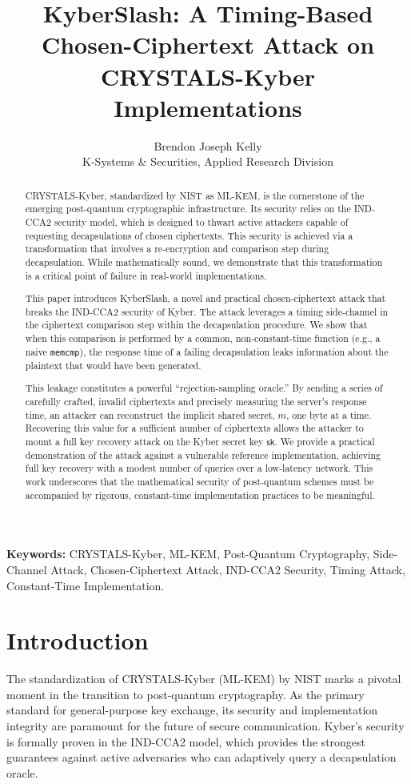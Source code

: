 \documentclass[11pt]{article}
\title{KyberSlash: A Timing-Based Chosen-Ciphertext Attack on CRYSTALS-Kyber Implementations}
\author{Brendon Joseph Kelly \\ K-Systems \& Securities, Applied Research Division}
\date{}
\begin{document}
\maketitle

\begin{abstract}
CRYSTALS-Kyber, standardized by NIST as ML-KEM, is the cornerstone of the emerging post-quantum cryptographic infrastructure. Its security relies on the IND-CCA2 security model, which is designed to thwart active attackers capable of requesting decapsulations of chosen ciphertexts. This security is achieved via a transformation that involves a re-encryption and comparison step during decapsulation. While mathematically sound, we demonstrate that this transformation is a critical point of failure in real-world implementations.

This paper introduces KyberSlash, a novel and practical chosen-ciphertext attack that breaks the IND-CCA2 security of Kyber. The attack leverages a timing side-channel in the ciphertext comparison step within the decapsulation procedure. We show that when this comparison is performed by a common, non-constant-time function (e.g., a naive \texttt{memcmp}), the response time of a failing decapsulation leaks information about the plaintext that would have been generated.

This leakage constitutes a powerful ``rejection-sampling oracle.'' By sending a series of carefully crafted, invalid ciphertexts and precisely measuring the server's response time, an attacker can reconstruct the implicit shared secret, $m$, one byte at a time. Recovering this value for a sufficient number of ciphertexts allows the attacker to mount a full key recovery attack on the Kyber secret key $\mathsf{sk}$. We provide a practical demonstration of the attack against a vulnerable reference implementation, achieving full key recovery with a modest number of queries over a low-latency network. This work underscores that the mathematical security of post-quantum schemes must be accompanied by rigorous, constant-time implementation practices to be meaningful.
\end{abstract}

\textbf{Keywords:} CRYSTALS-Kyber, ML-KEM, Post-Quantum Cryptography, Side-Channel Attack, Chosen-Ciphertext Attack, IND-CCA2 Security, Timing Attack, Constant-Time Implementation.

\section{Introduction}
The standardization of CRYSTALS-Kyber (ML-KEM) by NIST marks a pivotal moment in the transition to post-quantum cryptography. As the primary standard for general-purpose key exchange, its security and implementation integrity are paramount for the future of secure communication. Kyber's security is formally proven in the IND-CCA2 model, which provides the strongest guarantees against active adversaries who can adaptively query a decapsulation oracle.
\end{document}
